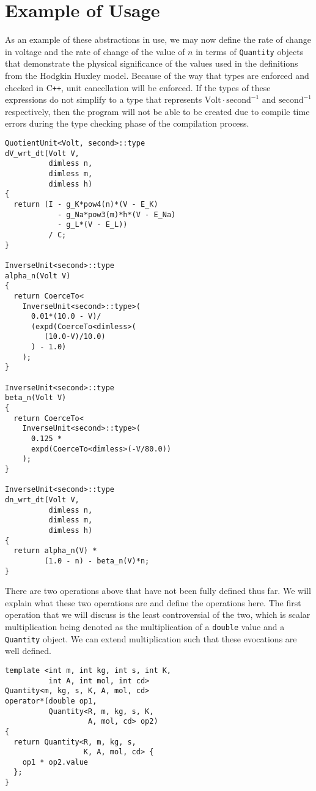 \documentclass[reprint]{revtex4-1}
\begin{document}
\section{Example of Usage}
As an example of these abstractions in use, we may now define the rate of change in voltage and the rate of
change of the value of $n$ in terms of \verb|Quantity| objects that demonstrate the physical
significance of the values used in the definitions from the Hodgkin Huxley model. Because of the way that
types are enforced and checked in C\verb!++!, unit cancellation will be enforced.
If the types of these expressions do not simplify to a type that represents
$\text{Volt}\cdot\text{second}^{-1}$ and $\text{second}^{-1}$ respectively, then the program will not be
able to be created due to compile time errors during the type checking phase of the compilation process.

\begin{verbatim}
QuotientUnit<Volt, second>::type
dV_wrt_dt(Volt V,
          dimless n,
          dimless m,
          dimless h)
{ 
  return (I - g_K*pow4(n)*(V - E_K) 
            - g_Na*pow3(m)*h*(V - E_Na)
            - g_L*(V - E_L))
          / C; 
}

InverseUnit<second>::type
alpha_n(Volt V)
{
  return CoerceTo<
    InverseUnit<second>::type>(
      0.01*(10.0 - V)/
      (expd(CoerceTo<dimless>(
         (10.0-V)/10.0)
      ) - 1.0)
    );
}

InverseUnit<second>::type
beta_n(Volt V)
{
  return CoerceTo<
    InverseUnit<second>::type>(
      0.125 * 
      expd(CoerceTo<dimless>(-V/80.0))
    );
}

InverseUnit<second>::type
dn_wrt_dt(Volt V,
          dimless n,
          dimless m,
          dimless h)
{
  return alpha_n(V) *
         (1.0 - n) - beta_n(V)*n;
}
\end{verbatim}

There are two operations above that have not been fully defined thus far. We will explain what these two operations
are and define the operations here. The first operation that we will discuss is the least controversial of the two,
which is scalar multiplication being denoted as the multiplication of a \verb|double| value and a \verb|Quantity|
object. We can extend multiplication such that these evocations are well defined.

\begin{verbatim}
template <int m, int kg, int s, int K,
          int A, int mol, int cd>
Quantity<m, kg, s, K, A, mol, cd>
operator*(double op1,
          Quantity<R, m, kg, s, K,
                   A, mol, cd> op2)
{
  return Quantity<R, m, kg, s,
                  K, A, mol, cd> {
    op1 * op2.value
  };
}
\end{verbatim}
\end{document}
